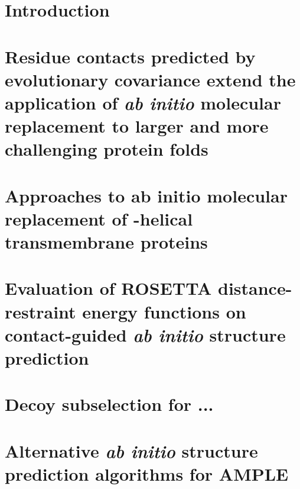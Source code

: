 \documentclass[11pt,oneside,leqno,openright]{report}
\begin{document}
% 
%
% 
%
%
%

\tableofcontents

%

\chapter{Introduction}
% 

\chapter{Residue contacts predicted by evolutionary covariance extend the application of \textit{ab initio} molecular replacement to larger and more challenging protein folds}
% 

\chapter{Approaches to ab initio molecular replacement of \textalpha-helical transmembrane proteins}
% 

\chapter{Evaluation of ROSETTA distance-restraint energy functions on contact-guided \textit{ab initio} structure prediction}


\chapter{Decoy subselection for ...}
% 

\chapter{Alternative \textit{ab initio} structure prediction algorithms for AMPLE}
% 
\end{document}
